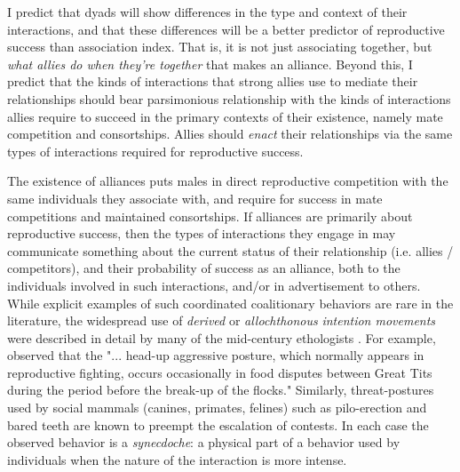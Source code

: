 \documentclass[11pt]{amsart}
\begin{document}
I predict that dyads will show differences in the type and context of their interactions, and that these differences will be a better predictor of reproductive success than association index. That is, it is not just associating together, but \textit{what allies do when they're together} that makes an alliance. Beyond this, I predict that the kinds of interactions that strong allies use to mediate their relationships should bear parsimonious relationship with the kinds of interactions allies require to succeed in the primary contexts of their existence, namely mate competition and consortships. Allies should \emph{enact} \citep[c.f.][]{VRT:1991} their relationships via the same types of interactions required for reproductive success. 

The existence of alliances puts males in direct reproductive competition with the same individuals they associate with, and require for success in mate competitions and maintained consortships. If alliances are primarily about reproductive success, then the types of interactions they engage in may communicate something about the current status of their relationship (i.e. allies / competitors), and their probability of success as an alliance, both to the individuals involved in such interactions, and/or in advertisement to others. %
%
While explicit examples of such coordinated coalitionary behaviors are rare in the literature, %
the widespread use of \emph{derived} or \emph{allochthonous} \emph{intention movements} were described in detail by many of the mid-century ethologists \citep[e.g.][]{daanje:1950,hinde:1952, tinbergen:1952}. For example, \citet{hinde:1952} observed that the "... head-up aggressive posture, which normally appears in reproductive fighting, occurs occasionally in food disputes between Great Tits during the period before the break-up of the flocks." Similarly, threat-postures used by social mammals (canines, primates, felines) such as pilo-erection and bared teeth are known to preempt the escalation of contests. In each case the observed behavior is a \textit{synecdoche}: a physical part of a behavior used by individuals when the nature of the interaction is more intense. 
\end{document}
